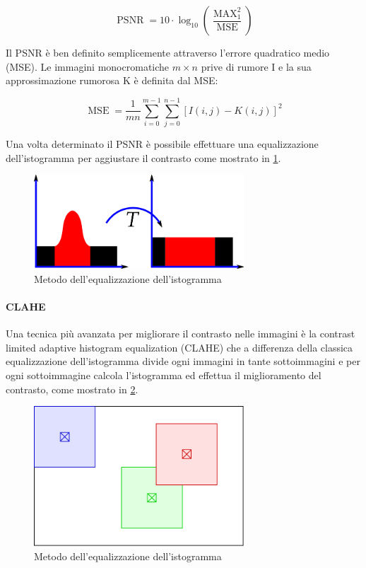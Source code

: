 \[ \operatorname{PSNR}=10 \cdot \log _{10}\left(\frac{\operatorname{MAX}_{1}^{2}}{\operatorname{MSE}}\right) \]

Il PSNR è ben definito semplicemente attraverso l'errore quadratico medio (MSE).
Le immagini monocromatiche \(m\times n\) prive di rumore I e la sua approssimazione rumorosa K è definita dal MSE:

\[ \operatorname{MSE}=\frac{1}{m n} \sum_{i=0}^{m-1} \sum_{j=0}^{n-1}[I(i, j)-K(i, j)]^{2} \]

Una volta determinato il PSNR è possibile effettuare una equalizzazione dell'istogramma per aggiustare il contrasto come mostrato in \cref{fig:histogram}\cite{pandey_contrast}\cite{permual_contrast}\cite{hummel_histogram}.

\begin{figure}[ht]
    \centering
    \includegraphics[width=0.7\textwidth]{preprocessing/histogram.png}
    \caption{Metodo dell'equalizzazione dell'istogramma}
    \label{fig:histogram}
\end{figure}

\paragraph{CLAHE}\label{clahe}

Una tecnica più avanzata per migliorare il contrasto nelle immagini è la contrast limited adaptive histogram equalization (CLAHE) che a differenza della classica equalizzazione dell'istogramma divide ogni immagini in tante sottoimmagini e per ogni sottoimmagine calcola l'istogramma ed effettua il miglioramento del contrasto, come mostrato in \cref{fig:clahe}\cite{hummel_histogram}.


\begin{figure}[ht]
    \centering
    \includegraphics[width=0.7\textwidth]{preprocessing/clahe.pdf}
    \caption{Metodo dell'equalizzazione dell'istogramma}
    \label{fig:clahe}
\end{figure}


